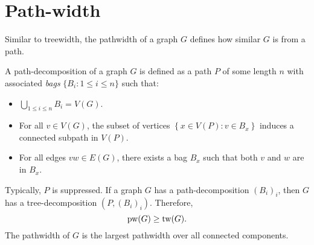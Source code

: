 \section{Path-width}\label{sec:Pathwidth}
Similar to treewidth, the pathwidth of a graph \(G\) defines how similar $G$ is from a path.

A path-decomposition of a graph \(G\) is defined as a path $P$ of some length $n$ with associated \textit{bags} \(\lbrace B_i : 1 \leq i \leq n \rbrace\) such that:
\begin{itemize}
	\item $\bigcup_{1 \leq i \leq n} B_i = V(G)$.
	\item For all \(v \in V(G)\), the subset of vertices \(\left\lbrace x \in V(P): v \in B_x \right\rbrace\) induces a connected subpath in \(V(P)\).
	\item For all edges \(vw \in E(G)\), there exists a bag \(B_x\) such that both \(v\) and \(w\) are in \(B_x\).
\end{itemize}

Typically, $P$ is suppressed.
If a graph $G$ has a path-decomposition \({(B_i)}_i\), then $G$ has a tree-decomposition \(\left(P,{(B_i)}_i\right)\). Therefore,
\begin{equation*}
	\operatorname{pw}(G) \geq \operatorname{tw}(G).
\end{equation*}
The pathwidth of \(G\) is the largest pathwidth over all connected components.

